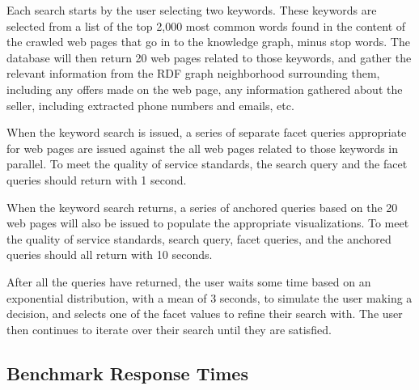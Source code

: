 Each search starts by the user selecting two keywords.  
These keywords are selected from a list of the top 2,000 most common words found in the content of the crawled web pages that go in to the knowledge graph, minus stop words. 
The database will then return 20 web pages related to those keywords, and gather the relevant information from the RDF graph neighborhood surrounding them, including any offers made on the web page, any information gathered about the seller, including extracted phone numbers and emails, etc.  

When the keyword search is issued, a series of separate facet queries appropriate for web pages are issued against the all web pages related to those keywords in parallel.
To meet the quality of service standards, the search query and the facet queries should return with 1 second.

When the keyword search returns, a series of anchored queries based on the 20 web pages will also be issued to populate the appropriate visualizations. 
To meet the quality of service standards, search query, facet queries, and the anchored queries should all return with 10 seconds.  

After all the queries have returned, the user waits some time based on an exponential distribution, with a mean of 3 seconds, to simulate the user making a decision, and selects one of the facet values to refine their search with.
The user then continues to iterate over their search until they are satisfied.  




\subsection{Benchmark Response Times}
